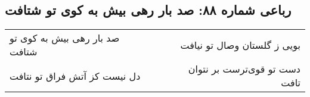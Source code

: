 \begin{center}
\section*{رباعی شماره ۸۸: صد بار رهی بیش به کوی تو شتافت}
\label{sec:sh088}
\begin{longtable}{l p{0.5cm} r}
صد بار رهی بیش به کوی تو شتافت
&&
بویی ز گلستان وصال تو نیافت
\\
دل نیست کز آتش فراق تو نتافت
&&
دست تو قوی‌ترست بر نتوان تافت
\\
\end{longtable}
\end{center}
